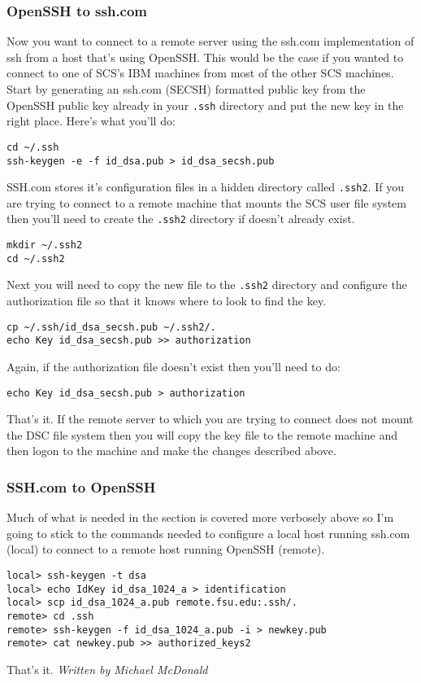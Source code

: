 \documentclass[12pt,a4paper]{article}
\begin{document}
\subsubsection*{OpenSSH to ssh.com}
Now you want to connect to a remote server using the ssh.com implementation of ssh from a host that's using OpenSSH. This would be the case if you wanted to connect to one of SCS's IBM machines from most of the other SCS machines. Start by generating an ssh.com (SECSH) formatted public key from the OpenSSH public key already in your \texttt{.ssh} directory and put the new key in the right place. Here's what you'll do:
\begin{verbatim}
cd ~/.ssh
ssh-keygen -e -f id_dsa.pub > id_dsa_secsh.pub
\end{verbatim}
SSH.com stores it's configuration files in a hidden directory called \texttt{.ssh2}. If you are trying to connect to a remote machine that mounts the SCS user file system then you'll need to create the \texttt{.ssh2} directory if doesn't already exist.
\begin{verbatim}
mkdir ~/.ssh2
cd ~/.ssh2
\end{verbatim}
Next you will need to copy the new file to the \texttt{.ssh2} directory and configure the authorization file so that it knows where to look to find the key.
\begin{verbatim}
cp ~/.ssh/id_dsa_secsh.pub ~/.ssh2/.
echo Key id_dsa_secsh.pub >> authorization
\end{verbatim}
Again, if the authorization file doesn't exist then you'll need to do:
\begin{verbatim}
echo Key id_dsa_secsh.pub > authorization
\end{verbatim}
That's it. If the remote server to which you are trying to connect does not mount the DSC file system then you will copy the key file to the remote machine and then logon to the machine and make the changes described above.

\subsubsection*{SSH.com to OpenSSH}
Much of what is needed in the section is covered more verbosely
above so I'm going to stick to the commands needed to configure a local
host running ssh.com (local) to connect to a remote host running
OpenSSH (remote).
\begin{verbatim}
local> ssh-keygen -t dsa
local> echo IdKey id_dsa_1024_a > identification
local> scp id_dsa_1024_a.pub remote.fsu.edu:.ssh/.
remote> cd .ssh
remote> ssh-keygen -f id_dsa_1024_a.pub -i > newkey.pub
remote> cat newkey.pub >> authorized_keys2
\end{verbatim}
That's it.
\hfill \textit{Written by Michael McDonald}
\end{document}
